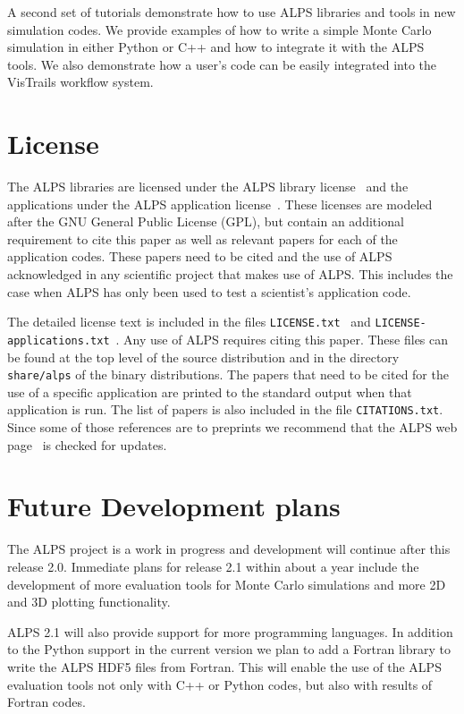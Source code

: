 \documentclass[12pt]{iopart}
\begin{document}
A second set of tutorials demonstrate how to use ALPS libraries and tools in new simulation codes. We provide examples of how to write a simple Monte Carlo simulation in either Python or C++  and how to integrate it with the ALPS tools. We also demonstrate how a user's code can be  easily integrated into the VisTrails workflow system.


\section{License}
The ALPS libraries are licensed under the ALPS library license~\cite{librarylicense} and the applications under the ALPS application license~\cite{applicationlicense}. These licenses are modeled after the GNU General Public License (GPL), but contain an additional requirement to cite this paper as well as relevant papers for each of the application codes. These papers need to be cited and the use of ALPS acknowledged in any scientific project that makes use of ALPS. This includes the case when ALPS has only been used to test a scientist's application code.

The detailed license text is included in the files {\tt LICENSE.txt}~\cite{librarylicense} and {\tt LICENSE-applications.txt}~\cite{applicationlicense}. Any use of ALPS requires citing this paper.  These files can be found at the top level of the source distribution and in the directory {\tt share/alps} of the binary distributions. The papers that need to be cited for the use of a specific application are printed to the standard output when that application is run. The list of papers is also included in the file {\tt CITATIONS.txt}. Since some of those references are to preprints we recommend that the ALPS web page~\cite{alps} is checked for updates.

\section{Future Development plans}

The ALPS project is a work in progress and development will continue after this release 2.0. Immediate plans for release 2.1 within about a year include the development of  more evaluation tools for Monte Carlo simulations and more 2D and 3D plotting functionality.

ALPS 2.1 will also provide support for more programming languages. In addition to the Python support in the current version we plan to add a Fortran library to write the ALPS HDF5 files from Fortran. This will enable the use of the ALPS evaluation tools not only with C++ or Python codes, but also with results of Fortran codes.
\end{document}
